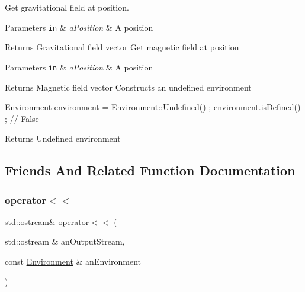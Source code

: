 Get gravitational field at position. 


\begin{DoxyParams}[1]{Parameters}
\mbox{\tt in}  & {\em a\+Position} & A position \\
\hline
\end{DoxyParams}
\begin{DoxyReturn}{Returns}
Gravitational field vector Get magnetic field at position
\end{DoxyReturn}

\begin{DoxyParams}[1]{Parameters}
\mbox{\tt in}  & {\em a\+Position} & A position \\
\hline
\end{DoxyParams}
\begin{DoxyReturn}{Returns}
Magnetic field vector Constructs an undefined environment
\end{DoxyReturn}

\begin{DoxyCode}
\hyperlink{classostk_1_1physics_1_1_environment_a9c721c6c5eba3608b2225922ab498c95}{Environment} environment = \hyperlink{classostk_1_1physics_1_1_environment_a0a6b08b9a19de02e9eeacdb0fcc0c588}{Environment::Undefined}() ;
environment.isDefined() ; \textcolor{comment}{// False}
\end{DoxyCode}


\begin{DoxyReturn}{Returns}
Undefined environment 
\end{DoxyReturn}


\subsection{Friends And Related Function Documentation}
\mbox{\label{classostk_1_1physics_1_1_environment_a7bc4b39898452fbe5ce3a8de75ad2596}} 
\subsubsection{\texorpdfstring{operator$<$$<$}{operator<<}}
{\footnotesize\ttfamily std\+::ostream\& operator$<$$<$ (\begin{DoxyParamCaption}\item[{std\+::ostream \&}]{an\+Output\+Stream,  }\item[{const \hyperlink{classostk_1_1physics_1_1_environment}{Environment} \&}]{an\+Environment }\end{DoxyParamCaption})\hspace{0.3cm}{\ttfamily [friend]}}



